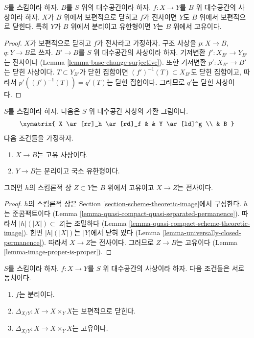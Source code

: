 \begin{lemma}
\label{lemma-image-proper-is-proper}
$S$를 스킴이라 하자. $B$를 $S$ 위의 대수공간이라 하자.
$f : X \to Y$를 $B$ 위 대수공간의 사상이라 하자.
$X$가 $B$ 위에서 보편적으로 닫히고 $f$가 전사이면
$Y$도 $B$ 위에서 보편적으로 닫힌다. 특히 $Y$가 $B$ 위에서 분리이고
유한형이면 $Y$는 $B$ 위에서 고유이다.
\end{lemma}

\begin{proof}
$X$가 보편적으로 닫히고 $f$가 전사라고 가정하자.
구조 사상을 $p : X \to B$, $q : Y \to B$로 쓰자.
$B' \to B$를 $S$ 위 대수공간의 사상이라 하자.
기저변환 $f' : X_{B'} \to Y_{B'}$는 전사이다
(Lemma \ref{lemma-base-change-surjective}). 또한 기저변환
$p' : X_{B'} \to B'$는 닫힌 사상이다.
$T \subset Y_{B'}$가 닫힌 집합이면 $(f')^{-1}(T) \subset X_{B'}$도
닫힌 집합이고, 따라서 $p'((f')^{-1}(T)) = q'(T)$는 닫힌 집합이다.
그러므로 $q'$는 닫힌 사상이다.
\end{proof}

\begin{lemma}
\label{lemma-scheme-theoretic-image-is-proper}
$S$를 스킴이라 하자. 다음은 $S$ 위 대수공간 사상의 가환 그림이다.
$$
\xymatrix{
X \ar[rr]_h \ar[rd]_f & & Y \ar[ld]^g \\
& B
}
$$
다음 조건들을 가정하자.
\begin{enumerate}
\item $X \to B$는 고유 사상이다.
\item $Y \to B$는 분리이고 국소 유한형이다.
\end{enumerate}
그러면 $h$의 스킴론적 상 $Z \subset Y$는 $B$ 위에서 고유이고
$X \to Z$는 전사이다.
\end{lemma}

\begin{proof}
$h$의 스킴론적 상은 Section \ref{section-scheme-theoretic-image}에서
구성한다. $h$는 준콤팩트이다
(Lemma \ref{lemma-quasi-compact-quasi-separated-permanence}).
따라서 $|h|(|X|) \subset |Z|$는 조밀하다
(Lemma \ref{lemma-quasi-compact-scheme-theoretic-image}).
한편 $|h|(|X|)$는 $|Y|$에서 닫혀 있다
(Lemma \ref{lemma-universally-closed-permanence}).
따라서 $X \to Z$는 전사이다.
그러므로 $Z \to B$는 고유이다
(Lemma \ref{lemma-image-proper-is-proper}).
\end{proof}

\begin{lemma}
\label{lemma-separated-diagonal-proper}
$S$를 스킴이라 하자.
$f : X \to Y$를 $S$ 위 대수공간의 사상이라 하자.
다음 조건들은 서로 동치이다.
\begin{enumerate}
\item $f$는 분리이다.
\item $\Delta_{X/Y} : X \to X \times_Y X$는 보편적으로 닫힌다.
\item $\Delta_{X/Y} : X \to X \times_Y X$는 고유이다.
\end{enumerate}
\end{lemma}

